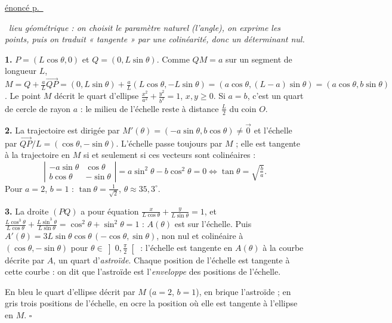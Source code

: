 \documentclass[a4paper,11pt]{article}
\numberwithin{equation}{section}
\numberwithin{figure}{section}
\numberwithin{table}{section}
\theoremstyle{enonce}
\theoremstyle{exemple}
\theoremstyle{remarque}
\newenvironment{corrige}[1]{%
  \par\needspace{6\baselineskip}\vspace{1em}\phantomsection\label{c:#1}%
  \noindent{\sffamily\bfseries\color{Bleu}Exercice~\ref{e:#1}}\quad
  {\scriptsize\sffamily\hyperref[e:#1]{\color{Gris}énoncé p.~\pageref{e:#1}}}\par\nobreak\vspace{0.2em}}%
  {\hfill\textcolor{BleuClair}{$\square$}\par}
\newcommand{\vv}[1]{\overrightarrow{#1}}
\newcommand{\ve}[1]{\vec{#1}}
\newcommand{\dt}[1]{\left|\begin{matrix}#1\end{matrix}\right|}
\newcommand{\demarche}[1]{\noindent{\sffamily\bfseries\small\color{BleuMoyen}Démarche.}\ \textit{#1}\par\smallskip}
\begin{document}
\begin{corrige}{echelle}
\demarche{lieu géométrique : on choisit le paramètre naturel (l'angle), on exprime les points, puis on traduit « tangente » par une colinéarité, donc un déterminant nul.}
\textbf{1.} $P=(L\cos\theta,0)$ et $Q=(0,L\sin\theta)$. Comme $QM=a$ sur un segment de longueur $L$,
$M=Q+\frac aL\vv{QP}=(0,L\sin\theta)+\frac aL(L\cos\theta,-L\sin\theta)=(a\cos\theta,(L-a)\sin\theta)=(a\cos\theta,b\sin\theta)$.
Le point $M$ décrit le quart d'ellipse $\frac{x^2}{a^2}+\frac{y^2}{b^2}=1$, $x,y\geq0$. Si $a=b$, c'est un quart de cercle
de rayon $a$ : le milieu de l'échelle reste à distance $\frac L2$ du coin $O$.

\textbf{2.} La trajectoire est dirigée par $M'(\theta)=(-a\sin\theta,b\cos\theta)\neq\ve0$ et l'échelle par
$\vv{QP}/L=(\cos\theta,-\sin\theta)$. L'échelle passe toujours par $M$ ; elle est tangente à la trajectoire en $M$ si et
seulement si ces vecteurs sont colinéaires :
\[\dt{-a\sin\theta&\cos\theta\\b\cos\theta&-\sin\theta}=a\sin^2\theta-b\cos^2\theta=0\iff\tan\theta=\sqrt{\tfrac ba}.\]
Pour $a=2$, $b=1$ : $\tan\theta=\frac1{\sqrt2}$, $\theta\approx35{,}3^\circ$.

\textbf{3.} La droite $(PQ)$ a pour équation $\frac x{L\cos\theta}+\frac y{L\sin\theta}=1$, et
$\frac{L\cos^3\theta}{L\cos\theta}+\frac{L\sin^3\theta}{L\sin\theta}=\cos^2\theta+\sin^2\theta=1$ : $A(\theta)$ est sur
l'échelle. Puis $A'(\theta)=3L\sin\theta\cos\theta\,(-\cos\theta,\sin\theta)$, non nul et colinéaire à
$(\cos\theta,-\sin\theta)$ pour $\theta\in\left]0,\frac\pi2\right[$ : l'échelle est tangente en $A(\theta)$ à la courbe
décrite par $A$, un quart d'\emph{astroïde}. Chaque position de l'échelle est tangente à cette courbe : on dit que
l'astroïde est l'\emph{enveloppe} des positions de l'échelle.
\begin{center}
\end{center}
En bleu le quart d'ellipse décrit par $M$ ($a=2$, $b=1$), en brique l'astroïde ; en gris trois positions de l'échelle, en
ocre la position où elle est tangente à l'ellipse en $M$.
\end{corrige}
\end{document}
